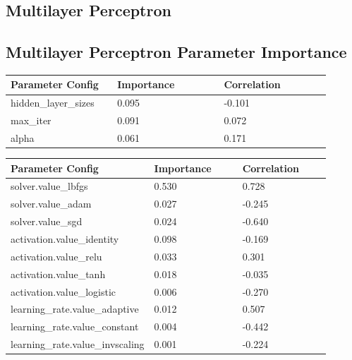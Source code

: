 \documentclass[11pt]{article}
\begin{document}
\begin{appendices}
\section{Multilayer Perceptron}

\subsection{Multilayer Perceptron Parameter Importance}
  \begin{table}[ht]
    \centering
    \begin{tabular}{|p{0.3\linewidth} | p{0.3\linewidth}| p{0.3\linewidth}|} 
      \hline
      \textbf{Parameter Config}  & \textbf{Importance} & \textbf{Correlation} \\ \hline
        hidden\_layer\_sizes & 0.095 & -0.101 \\ \hline
        max\_iter & 0.091 & 0.072 \\ \hline
        alpha & 0.061 & 0.171 \\ \hline
    \end{tabular}
  \end{table}\label{MLP_ParamImp1}

  
  \begin{table}[ht]
    \centering
    \begin{tabular}{|p{0.3\linewidth} | p{0.3\linewidth}| p{0.3\linewidth}|} 
      \hline
      \textbf{Parameter Config}  & \textbf{Importance} & \textbf{Correlation} \\ \hline
        solver.value\_lbfgs & 0.530 & 0.728 \\ \hline
        solver.value\_adam & 0.027 & -0.245 \\ \hline
        solver.value\_sgd & 0.024 & -0.640 \\ \hline
        activation.value\_identity & 0.098 & -0.169 \\ \hline
        activation.value\_relu & 0.033 & 0.301 \\ \hline
        activation.value\_tanh & 0.018 & -0.035 \\ \hline
        activation.value\_logistic & 0.006 & -0.270 \\ \hline
        learning\_rate.value\_adaptive & 0.012 & 0.507 \\ \hline
        learning\_rate.value\_constant & 0.004 & -0.442 \\ \hline
        learning\_rate.value\_invscaling & 0.001 & -0.224 \\ \hline
    \end{tabular}
  \end{table}\label{MLP_ParamImp2}


\end{appendices}
\end{document}
